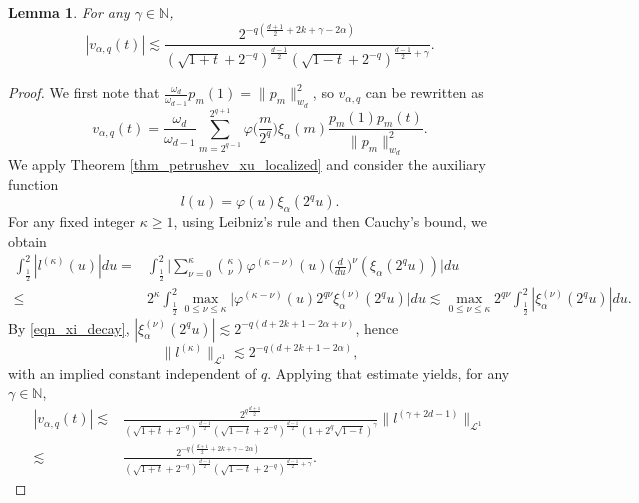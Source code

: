 \documentclass{article}
\numberwithin{equation}{section}
\newtheorem{lemma}{Lemma}
\def\NN{\mathbb{N}}
\def\sul{\sum\limits}
\begin{document}
\begin{lemma}\label{lem_local_poly}
For any $\gamma\in\NN$,
        \begin{equation}
            |v_{\alpha,q}(t)|\lesssim\frac{2^{-q(\frac{d+1}{2}+2k+\gamma-2\alpha)}}{(\sqrt{1+t}+2^{-q})^{\frac{d-1}{2}}(\sqrt{1-t}+2^{-q})^{\frac{d-1}{2}+\gamma}}.
        \end{equation}
\end{lemma}

\begin{proof}
    We first note that $\frac{\omega_d}{\omega_{d-1}}p_m(1)=\|p_m\|_{w_d}^2$, so $v_{\alpha,q}$ can be rewritten as
    \begin{equation}
        v_{\alpha,q}(t)=\frac{\omega_d}{\omega_{d-1}}\sul_{m=2^{q-1}}^{2^{q+1}}\varphi\big(\frac{m}{2^q}\big)\xi_\alpha(m)\frac{p_m(1)p_m(t)}{\|p_m\|_{w_d}^2}.
    \end{equation}
    We apply Theorem \ref{thm_petrushev_xu_localized} and consider the auxiliary function
    \begin{equation*}
        l(u)=\varphi(u)\xi_\alpha(2^qu).
    \end{equation*}
    For any fixed integer $\kappa\ge1$, using Leibniz’s rule and then Cauchy’s bound, we obtain
    \begin{equation}
        \begin{split}
            \int_{\frac{1}{2}}^2|l^{(\kappa)}(u)|du
            =&\int_{\frac{1}{2}}^2\Bigg|\sul_{\nu=0}^\kappa\binom{\kappa}{\nu}\varphi^{(\kappa-\nu)}(u)\Big(\frac{d}{du}\Big)^\nu(\xi_\alpha(2^qu))\Bigg|du\\
            \leq&2^\kappa\int_{\frac{1}{2}}^2\max\limits_{0\leq\nu\leq\kappa}\big|\varphi^{(\kappa-\nu)}(u)2^{q\nu}\xi_\alpha^{(\nu)}(2^qu)\big|du
            \lesssim\max\limits_{0\leq\nu\leq\kappa}2^{q\nu}\int_{\frac{1}{2}}^2|\xi_\alpha^{(\nu)}(2^qu)|du.
        \end{split}
    \end{equation}
    By \eqref{eqn_xi_decay}, $|\xi_\alpha^{(\nu)}(2^qu)|\lesssim2^{-q(d+2k+1-2\alpha+\nu)}$, hence
    \begin{equation}
        \|l^{(\kappa)}\|_{\mathcal{L}^1}\lesssim2^{-q(d+2k+1-2\alpha)},
    \end{equation}
    with an implied constant independent of $q$. 
    Applying that estimate yields, for any $\gamma\in\NN$,
    \begin{equation*}
        \begin{split}
            |v_{\alpha,q}(t)|
            \lesssim&\frac{2^{q\frac{d+1}{2}}}{(\sqrt{1+t}+2^{-q})^{\frac{d-1}{2}}(\sqrt{1-t}+2^{-q})^{\frac{d-1}{2}}(1+2^q\sqrt{1-t})^{\gamma}}\|l^{(\gamma+2d-1)}\|_{\mathcal{L}^1}\\
            \lesssim&\frac{2^{-q(\frac{d+1}{2}+2k+\gamma-2\alpha)}}{(\sqrt{1+t}+2^{-q})^{\frac{d-1}{2}}(\sqrt{1-t}+2^{-q})^{\frac{d-1}{2}+\gamma}}.
        \end{split}
    \end{equation*}
\end{proof}
\end{document}
